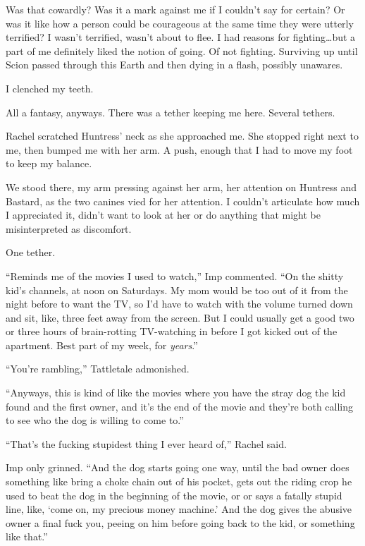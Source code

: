 Was that cowardly?  Was it a mark against me if I couldn't say for certain?  Or was it like how a person could be courageous at the same time they were utterly terrified?  I wasn't terrified, wasn't about to flee.  I had reasons for fighting\ldots but a part of me definitely liked the notion of going.  Of not fighting.  Surviving up until Scion passed through this Earth and then dying in a flash, possibly unawares.



I clenched my teeth.



All a fantasy, anyways.  There was a tether keeping me here.  Several tethers.



Rachel scratched Huntress' neck as she approached me.  She stopped right next to me, then bumped me with her arm.  A push, enough that I had to move my foot to keep my balance.



We stood there, my arm pressing against her arm, her attention on Huntress and Bastard, as the two canines vied for her attention.  I couldn't articulate how much I appreciated it, didn't want to look at her or do anything that might be misinterpreted as discomfort.



One tether.



``Reminds me of the movies I used to watch,'' Imp commented.  ``On the shitty kid's channels, at noon on Saturdays.  My mom would be too out of it from the night before to want the TV, so I'd have to watch with the volume turned down and sit, like, three feet away from the screen.  But I could usually get a good two or three hours of brain-rotting TV-watching in before I got kicked out of the apartment.  Best part of my week, for \emph{years}.''



``You're rambling,'' Tattletale admonished.



``Anyways, this is kind of like the movies where you have the stray dog the kid found and the first owner, and it's the end of the movie and they're both calling to see who the dog is willing to come to.''



``That's the fucking stupidest thing I ever heard of,'' Rachel said.



Imp only grinned.  ``And the dog starts going one way, until the bad owner does something like bring a choke chain out of his pocket, gets out the riding crop he used to beat the dog in the beginning of the movie, or or says a fatally stupid line, like, `come on, my precious money machine.'  And the dog gives the abusive owner a final fuck you, peeing on him before going back to the kid, or something like that.''



